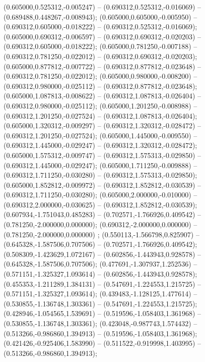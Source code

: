  (0.605000,0.525312,-0.005247) -- (0.690312,0.525312,-0.016069) -- (0.689488,0.448267,-0.008943);
 (0.605000,0.605000,-0.005950) -- (0.690312,0.605000,-0.018222) -- (0.690312,0.525312,-0.016069);
 (0.605000,0.690312,-0.006597) -- (0.690312,0.690312,-0.020203) -- (0.690312,0.605000,-0.018222);
 (0.605000,0.781250,-0.007188) -- (0.690312,0.781250,-0.022012) -- (0.690312,0.690312,-0.020203);
 (0.605000,0.877812,-0.007722) -- (0.690312,0.877812,-0.023648) -- (0.690312,0.781250,-0.022012);
 (0.605000,0.980000,-0.008200) -- (0.690312,0.980000,-0.025112) -- (0.690312,0.877812,-0.023648);
 (0.605000,1.087813,-0.008622) -- (0.690312,1.087813,-0.026404) -- (0.690312,0.980000,-0.025112);
 (0.605000,1.201250,-0.008988) -- (0.690312,1.201250,-0.027524) -- (0.690312,1.087813,-0.026404);
 (0.605000,1.320312,-0.009297) -- (0.690312,1.320312,-0.028472) -- (0.690312,1.201250,-0.027524);
 (0.605000,1.445000,-0.009550) -- (0.690312,1.445000,-0.029247) -- (0.690312,1.320312,-0.028472);
 (0.605000,1.575312,-0.009747) -- (0.690312,1.575313,-0.029850) -- (0.690312,1.445000,-0.029247);
 (0.605000,1.711250,-0.009888) -- (0.690312,1.711250,-0.030280) -- (0.690312,1.575313,-0.029850);
 (0.605000,1.852812,-0.009972) -- (0.690312,1.852812,-0.030539) -- (0.690312,1.711250,-0.030280);
 (0.605000,2.000000,-0.010000) -- (0.690312,2.000000,-0.030625) -- (0.690312,1.852812,-0.030539);
 (0.607934,-1.751043,0.485283) -- (0.702571,-1.766926,0.409542) -- (0.781250,-2.000000,0.000000);
 (0.690312,-2.000000,0.000000) -- (0.781250,-2.000000,0.000000) ;
 (0.550113,-1.566798,0.825907) -- (0.645328,-1.587506,0.707506) -- (0.702571,-1.766926,0.409542);
 (0.508309,-1.423629,1.072167) -- (0.602856,-1.443943,0.928578) -- (0.645328,-1.587506,0.707506);
 (0.477691,-1.307937,1.252536) -- (0.571151,-1.325327,1.093614) -- (0.602856,-1.443943,0.928578);
 (0.455353,-1.211289,1.384131) -- (0.547691,-1.224553,1.215725) -- (0.571151,-1.325327,1.093614);
 (0.439483,-1.128125,1.477614) -- (0.530855,-1.136748,1.303361) -- (0.547691,-1.224553,1.215725);
 (0.428946,-1.054565,1.539691) -- (0.519596,-1.058403,1.361968) -- (0.530855,-1.136748,1.303361);
 (0.423048,-0.987743,1.574432) -- (0.513266,-0.986860,1.394913) -- (0.519596,-1.058403,1.361968);
 (0.421426,-0.925406,1.583990) -- (0.511522,-0.919998,1.403995) -- (0.513266,-0.986860,1.394913);
